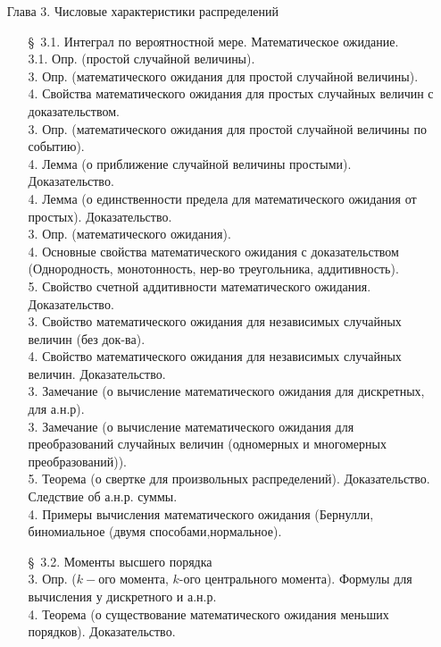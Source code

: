\documentclass[10pt]{amsart}
\begin{document}
\begin{enumerate}
    
\item[Глава 3.] Числовые характеристики распределений \\
    
\begin{enumerate}
\item[\S\, 3.1.] Интеграл по вероятностной мере. Математическое ожидание. \\
3.1. Опр. (простой случайной величины). \\
3. Опр. (математического ожидания для простой случайной величины). \\
4. Свойства математического ожидания для  простых случайных величин с доказательством. \\
3. Опр. (математического ожидания для простой случайной величины по событию). \\
4. Лемма (о приближение случайной величины простыми). Доказательство. \\
4. Лемма (о единственности предела для математического ожидания от простых). Доказательство. \\ 
3. Опр. (математического ожидания). \\
4. Основные свойства математического ожидания с доказательством (Однородность, монотонность, нер-во треугольника, аддитивность). \\
5.  Свойство счетной аддитивности математического ожидания. Доказательство. \\
3. Свойство  математического ожидания для независимых случайных величин (без док-ва). \\
4. Свойство  математического ожидания для независимых случайных величин. Доказательство. \\
3. Замечание (о вычисление  математического ожидания для дискретных, для а.н.р). \\
3. Замечание (о вычисление  математического ожидания для преобразований случайных величин (одномерных и многомерных преобразований)). \\
5. Теорема (о свертке для произвольных распределений). Доказательство. Следствие об а.н.р. суммы. \\ 
4. Примеры вычисления математического ожидания (Бернулли, биномиальное (двумя способами,нормальное). \\


\item[\S\, 3.2.] Моменты высшего порядка \\
3. Опр. ($k-$ого момента, $k$-ого центрального момента). Формулы для вычисления у дискретного и а.н.р. \\
4. Теорема (о существование математического ожидания меньших порядков). Доказательство. \\



\end{enumerate}
\end{enumerate}
\end{document}
